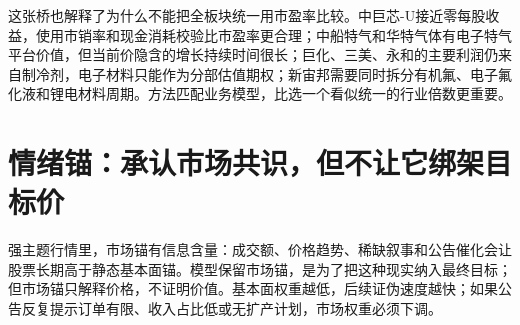 这张桥也解释了为什么不能把全板块统一用市盈率比较。中巨芯-U接近零每股收益，使用市销率和现金消耗校验比市盈率更合理；中船特气和华特气体有电子特气平台价值，但当前价隐含的增长持续时间很长；巨化、三美、永和的主要利润仍来自制冷剂，电子材料只能作为分部估值期权；新宙邦需要同时拆分有机氟、电子氟化液和锂电材料周期。方法匹配业务模型，比选一个看似统一的行业倍数更重要。

\section{情绪锚：承认市场共识，但不让它绑架目标价}
强主题行情里，市场锚有信息含量：成交额、价格趋势、稀缺叙事和公告催化会让股票长期高于静态基本面锚。模型保留市场锚，是为了把这种现实纳入最终目标；但市场锚只解释价格，不证明价值。基本面权重越低，后续证伪速度越快；如果公告反复提示订单有限、收入占比低或无扩产计划，市场权重必须下调。

